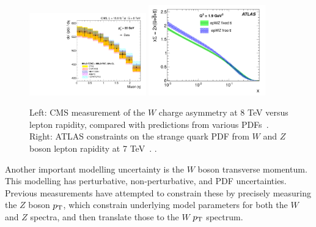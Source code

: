 \begin{figure}[p]
    \centering
    \includegraphics[width=0.45\textwidth]{figures/ss-precision-wmass-wasymmetry.pdf}
    \includegraphics[width=0.45\textwidth]{figures/ss-precision-wmass-wzratio.pdf}
    \caption{
    Left: CMS measurement of the $W$ charge asymmetry at 8 TeV versus lepton
    rapidity, compared with predictions from various PDFs~\cite{Khachatryan:2016pev}.
    Right:  ATLAS constraints on the strange quark PDF from $W$ and $Z$ boson lepton rapidity at 7 TeV~\cite{Aad:2012sb}. 
    .}
    \label{fig:ss-precision-wmass-pdf}
\end{figure}

Another important modelling uncertainty is the $W$ boson transverse
momentum.  This modelling has perturbative, non-perturbative, and PDF
uncertainties. Previous measurements have attempted to constrain these
by precisely measuring the $Z$ boson $p_{\mathrm{T}}$, which constrain underlying
model parameters for both the $W$ and $Z$ spectra, and then translate
those to the $W$ $p_{\mathrm{T}}$ spectrum. 



